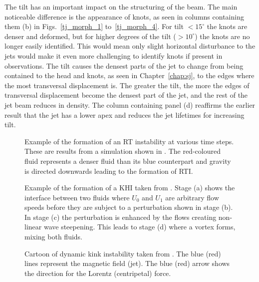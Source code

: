 \documentclass[12pt]{ociamthesis}
\newcommand{\mfig}[4]{
  \begin{figure}
  \begin{center}
  \texttt{[image: \#2]}
  \caption{#3}
  \label{#4}
  \end{center}
  \end{figure}}
\newcommand{\degs}{^{\circ}}
\begin{document}
%
The tilt has an important impact on the structuring of the beam. The main noticeable difference is the appearance of knots, as seen in columns containing them (b) in Figs.~\ref{tj_morph_1} to~\ref{tj_morph_4}. For tilt $<15\degs$ the knots are denser and deformed, but for higher degrees of the tilt ($> 10^{\circ}$) the knots are no longer easily identified. This would mean only slight horizontal disturbance to the jets would make it even more challenging to identify knots if present in observations. The tilt causes the densest parts of the jet to change from being contained to the head and knots, as seen in Chapter~\ref{chap:sj}, to the edges where the most transversal displacement is. The greater the tilt, the more the edges of transversal displacement become the densest part of the jet, and the rest of the jet beam reduces in density. The column containing panel (d) reaffirms the earlier result that the jet has a lower apex and reduces the jet lifetimes for increasing tilt.
%
\begin{figure}
\captionsetup[subfigure]{labelformat=empty}
\centering
{}
\caption{Example of the formation of an RT instability at various time steps. These are results from a simulation shown in \cite{Liang2019PhFl31k2104L}. The red-coloured fluid represents a denser fluid than its blue counterpart and gravity is directed downwards leading to the formation of RTI.}
\label{RT_example}
\end{figure}
\begin{figure}
\captionsetup[subfigure]{labelformat=empty}
\centering
{}
\caption{Example of the formation of a KHI taken from \cite{Barbulescu2018SoPh29386B}. Stage (a) shows the interface between two fluids where $U_0$ and $U_1$ are arbitrary flow speeds before they are subject to a perturbation shown in stage (b). In stage (c) the perturbation is enhanced by the flows creating non-linear wave steepening. This leads to stage (d) where a vortex forms, mixing both fluids.}
\label{KHI_example}
\end{figure}
\begin{figure}
\captionsetup[subfigure]{labelformat=empty}
\centering
{}
\caption{Cartoon of dynamic kink instability taken from \cite{Zaqarashvili2020ApJ893L46Z}. The blue (red) lines represent the magnetic field (jet). The blue (red) arrow shows the direction for the Lorentz (centripetal) force.}
\label{DKI_example}
\end{figure}
\end{document}
